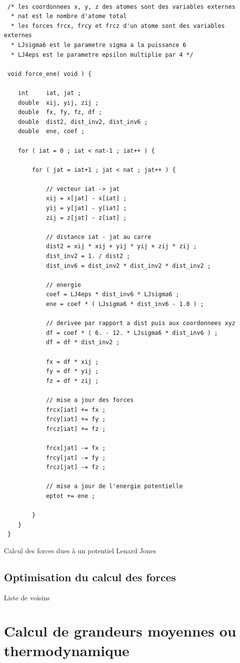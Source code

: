\documentclass[11pt,a4paper,fleqn]{book}
\begin{document}
\begin{codesource}[htbp]
\begin{lstlisting}

 /* les coordonnees x, y, z des atomes sont des variables externes
  * nat est le nombre d'atome total
  * les forces frcx, frcy et frcz d'un atome sont des variables externes
  * LJsigma6 est le parametre sigma a la puissance 6
  * LJ4eps est le parametre epsilon multiplie par 4 */

 void force_ene( void ) {

	int 	iat, jat ;
	double	xij, yij, zij ;
	double	fx, fy, fz, df ;
	double	dist2, dist_inv2, dist_inv6 ;
	double	ene, coef ;

	for ( iat = 0 ; iat < nat-1 ; iat++ ) {

		for ( jat = iat+1 ; jat < nat ; jat++ ) {

			// vecteur iat -> jat
			xij = x[jat] - x[iat] ;
			yij = y[jat] - y[iat] ;
			zij = z[jat] - z[iat] ;

			// distance iat - jat au carre
			dist2 = xij * xij + yij * yij + zij * zij ;
			dist_inv2 = 1. / dist2 ;
			dist_inv6 = dist_inv2 * dist_inv2 * dist_inv2 ;

			// energie
			coef = LJ4eps * dist_inv6 * LJsigma6 ;
			ene = coef * ( LJsigma6 * dist_inv6 - 1.0 ) ;
				
			// derivee par rapport a dist puis aux coordonnees xyz
			df = coef * ( 6. - 12. * LJsigma6 * dist_inv6 ) ;
			df = df * dist_inv2 ;

			fx = df * xij ;
			fy = df * yij ;
			fz = df * zij ;

			// mise a jour des forces
			frcx[iat] += fx ;
			frcy[iat] += fy ;
			frcz[iat] += fz ;

			frcx[jat] -= fx ;
			frcy[jat] -= fy ;
			frcz[jat] -= fz ;

			// mise a jour de l'energie potentielle
			eptot += ene ;

		}
	}
 }
\end{lstlisting}
	\caption{Calcul des forces dues à un potentiel Lenard Jones}
	\label{code_force_simple}
\end{codesource}


\subsection{Optimisation du calcul des forces}

Liste de voisins

\section{Calcul de grandeurs moyennes ou thermodynamique}
\end{document}
